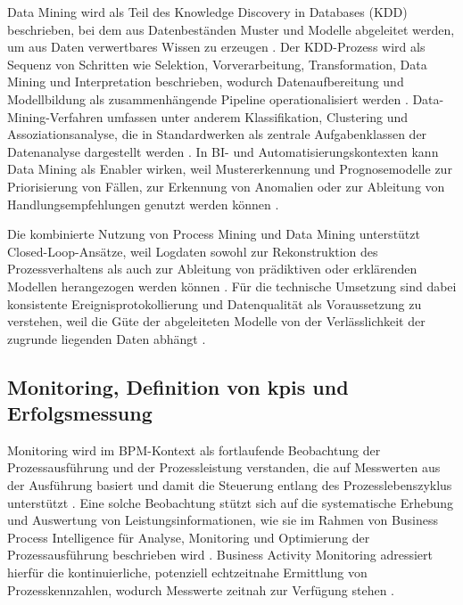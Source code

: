 Data Mining wird als Teil des Knowledge Discovery in Databases (KDD) beschrieben, bei dem aus Datenbeständen Muster und Modelle abgeleitet werden, um aus Daten verwertbares Wissen zu erzeugen \cite{Fayyad1996KDD}. 
Der KDD-Prozess wird als Sequenz von Schritten wie Selektion, Vorverarbeitung, Transformation, Data Mining und Interpretation beschrieben, wodurch Datenaufbereitung und Modellbildung als zusammenhängende Pipeline operationalisiert werden \cite{Fayyad1996KDD}. 
Data-Mining-Verfahren umfassen unter anderem Klassifikation, Clustering und Assoziationsanalyse, die in Standardwerken als zentrale Aufgabenklassen der Datenanalyse dargestellt werden \cite{HanKamberPei2012}. 
In BI- und Automatisierungskontexten kann Data Mining als Enabler wirken, weil Mustererkennung und Prognosemodelle zur Priorisierung von Fällen, zur Erkennung von Anomalien oder zur Ableitung von Handlungsempfehlungen genutzt werden können \cite{HanKamberPei2012,Grigori2004BPI}. 

Die kombinierte Nutzung von Process Mining und Data Mining unterstützt Closed-Loop-Ansätze, weil Logdaten sowohl zur Rekonstruktion des Prozessverhaltens als auch zur Ableitung von prädiktiven oder erklärenden Modellen herangezogen werden können \cite{Aalst2016ProcessMining,HanKamberPei2012}. 
Für die technische Umsetzung sind dabei konsistente Ereignisprotokollierung und Datenqualität als Voraussetzung zu verstehen, weil die Güte der abgeleiteten Modelle von der Verlässlichkeit der zugrunde liegenden Daten abhängt \cite{Aalst2016ProcessMining,WangStrong1996}. 


\subsection{Monitoring, Definition von \glspl{kpi} und Erfolgsmessung}
Monitoring wird im BPM-Kontext als fortlaufende Beobachtung der Prozessausführung und der Prozessleistung verstanden, die auf Messwerten aus der Ausführung basiert und damit die Steuerung entlang des Prozesslebenszyklus unterstützt \cite{DumasEtAl2013}. 
Eine solche Beobachtung stützt sich auf die systematische Erhebung und Auswertung von Leistungsinformationen, wie sie im Rahmen von Business Process Intelligence für Analyse, Monitoring und Optimierung der Prozessausführung beschrieben wird \cite{Grigori2004BPI}. 
Business Activity Monitoring adressiert hierfür die kontinuierliche, potenziell echtzeitnahe Ermittlung von Prozesskennzahlen, wodurch Messwerte zeitnah zur Verfügung stehen \cite{Wetzstein2008BAM}. 

